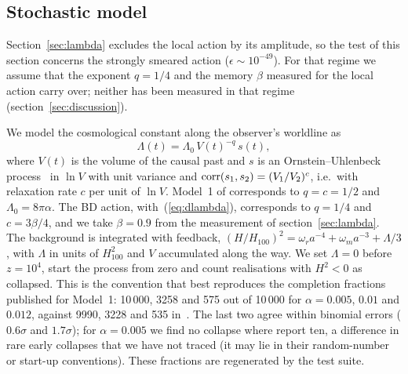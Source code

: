 \documentclass{iopjournal}
\newcommand{\eref}[1]{(\ref{#1})}
\begin{document}
\subsection{Stochastic model}

Section~\ref{sec:lambda} excludes the local action by its amplitude, so the
test of this section concerns the strongly smeared action
($\epsilon\sim10^{-49}$). For that regime we assume that the exponent $q=1/4$ and the
memory $\beta$ measured for the local action carry over; neither has been
measured in that regime (section~\ref{sec:discussion}).

We model the cosmological constant along the observer's worldline as
\begin{equation}
\Lambda(t)=\Lambda_0\,V(t)^{-q}\,s(t),
\label{eq:model}
\end{equation}
where $V(t)$ is the volume of the causal past and $s$ is an
Ornstein--Uhlenbeck process~\cite{Uhlenbeck1930} in $\ln V$ with unit
variance and ${\rm corr}(s_1,s_2)=(V_1/V_2)^c$, i.e.\ with relaxation rate
$c$ per unit of $\ln V$. Model~1 of
\cite{Das2023} corresponds to $q=c=1/2$ and $\Lambda_0=8\pi\alpha$. The BD
action, with~\eref{eq:dlambda}, corresponds to $q=1/4$ and $c=3\beta/4$, and we
take $\beta=0.9$ from the measurement of section~\ref{sec:lambda}. The background is integrated with
feedback, $(H/H_{100})^2=\omega_r a^{-4}+\omega_m a^{-3}+\Lambda/3$, with
$\Lambda$ in units of $H_{100}^2$ and $V$ accumulated along the way. We set
$\Lambda=0$ before $z=10^4$, start the process from zero and count
realisations with $H^2<0$ as collapsed. This is the convention that best
reproduces the completion fractions published for Model~1: 10\,000, 3258 and
575 out of 10\,000 for $\alpha=0.005$, $0.01$ and $0.012$, against 9990, 3228
and 535 in~\cite{Das2023}. The last two agree within binomial errors
($0.6\sigma$ and $1.7\sigma$); for $\alpha=0.005$ we find no collapse where
\cite{Das2023} report ten, a difference in rare early collapses that we have
not traced (it may lie in their random-number or start-up conventions). These
fractions are regenerated by the test suite.
\end{document}
